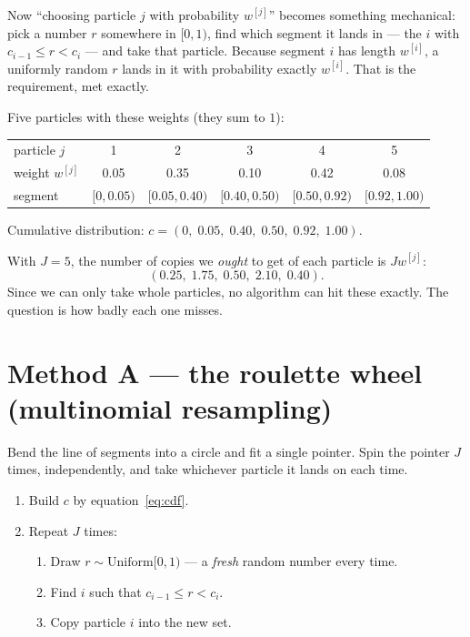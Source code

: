 \documentclass[11pt,a4paper]{report}
\begin{document}
Now ``choosing particle $j$ with probability $w^{[j]}$'' becomes something
mechanical: pick a number $r$ somewhere in $[0,1)$, find which segment it lands
in --- the $i$ with $c_{i-1} \le r < c_i$ --- and take that particle. Because
segment $i$ has length $w^{[i]}$, a uniformly random $r$ lands in it with
probability exactly $w^{[i]}$. That is the requirement, met exactly.

\begin{plain}
Five particles with these weights (they sum to $1$):
\begin{center}
\begin{tabular}{@{}lccccc@{}}
\toprule
particle $j$ & 1 & 2 & 3 & 4 & 5 \\
weight $w^{[j]}$ & 0.05 & 0.35 & 0.10 & 0.42 & 0.08 \\
\midrule
segment & $[0,0.05)$ & $[0.05,0.40)$ & $[0.40,0.50)$ & $[0.50,0.92)$ & $[0.92,1.00)$ \\
\bottomrule
\end{tabular}
\end{center}
Cumulative distribution:
$c = (0,\; 0.05,\; 0.40,\; 0.50,\; 0.92,\; 1.00)$.

\smallskip
With $J = 5$, the number of copies we \emph{ought} to get of each particle is
$J w^{[j]}$:
\[
(0.25,\; 1.75,\; 0.50,\; 2.10,\; 0.40).
\]
Since we can only take whole particles, no algorithm can hit these exactly.
The question is how badly each one misses.
\end{plain}

\section{Method A --- the roulette wheel (multinomial resampling)}

Bend the line of segments into a circle and fit a single pointer. Spin the
pointer $J$ times, independently, and take whichever particle it lands on each
time.

\begin{plain}
\begin{enumerate}[leftmargin=1.8em,itemsep=1pt]
\item Build $c$ by equation~\eqref{eq:cdf}.
\item Repeat $J$ times:
  \begin{enumerate}[leftmargin=1.4em,label=\alph*.]
  \item Draw $r \sim \mathrm{Uniform}[0,1)$ --- a \emph{fresh} random number
  every time.
  \item Find $i$ such that $c_{i-1} \le r < c_i$.
  \item Copy particle $i$ into the new set.
  \end{enumerate}
\end{enumerate}
\end{plain}
\end{document}
